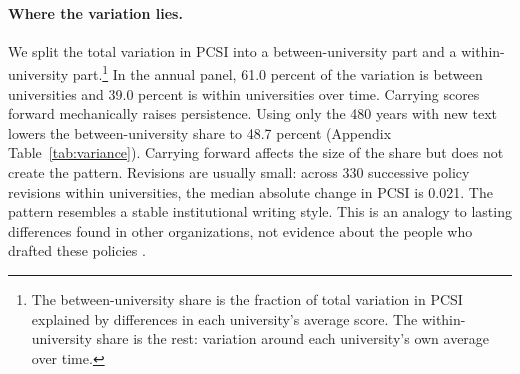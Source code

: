 \documentclass[11pt]{article}
\begin{document}
\paragraph{Where the variation lies.} We split the total variation in PCSI into a between-university part and a within-university part.\footnote{The between-university share is the fraction of total variation in PCSI explained by differences in each university's average score. The within-university share is the rest: variation around each university's own average over time.} In the annual panel, 61.0 percent of the variation is between universities and 39.0 percent is within universities over time. Carrying scores forward mechanically raises persistence. Using only the 480 years with new text lowers the between-university share to 48.7 percent (Appendix Table~\ref{tab:variance}). Carrying forward affects the size of the share but does not create the pattern. Revisions are usually small: across 330 successive policy revisions within universities, the median absolute change in PCSI is 0.021. The pattern resembles a stable institutional writing style. This is an analogy to lasting differences found in other organizations, not evidence about the people who drafted these policies \citep[compare][]{bertrand2003managing}.
\end{document}
